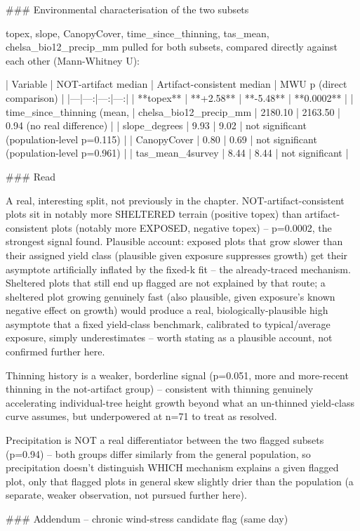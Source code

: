 ### Environmental characterisation of the two subsets

topex, slope, CanopyCover, time_since_thinning, tas_mean, chelsa_bio12_precip_mm pulled for both
subsets, compared directly against each other (Mann-Whitney U):

| Variable | NOT-artifact median | Artifact-consistent median | MWU p (direct comparison) |
|---|---:|---:|---:|
| **topex** | **+2.58** | **-5.48** | **0.0002** |
| time_since_thinning (mean, %
| chelsa_bio12_precip_mm | 2180.10 | 2163.50 | 0.94 (no real difference) |
| slope_degrees | 9.93 | 9.02 | not significant (population-level p=0.115) |
| CanopyCover | 0.80 | 0.69 | not significant (population-level p=0.961) |
| tas_mean_4survey | 8.44 | 8.44 | not significant |

### Read

A real, interesting split, not previously in the chapter. NOT-artifact-consistent plots sit in
notably more SHELTERED terrain (positive topex) than artifact-consistent plots (notably more
EXPOSED, negative topex) -- p=0.0002, the strongest signal found. Plausible account: exposed
plots that grow slower than their assigned yield class (plausible given exposure suppresses
growth) get their asymptote artificially inflated by the fixed-k fit -- the already-traced
mechanism. Sheltered plots that still end up flagged are not explained by that route; a sheltered
plot growing genuinely fast (also plausible, given exposure's known negative effect on growth)
would produce a real, biologically-plausible high asymptote that a fixed yield-class benchmark,
calibrated to typical/average exposure, simply underestimates -- worth stating as a plausible
account, not confirmed further here.

Thinning history is a weaker, borderline signal (p=0.051, more and more-recent thinning in the
not-artifact group) -- consistent with thinning genuinely accelerating individual-tree height
growth beyond what an un-thinned yield-class curve assumes, but underpowered at n=71 to treat as
resolved.

Precipitation is NOT a real differentiator between the two flagged subsets (p=0.94) -- both
groups differ similarly from the general population, so precipitation doesn't distinguish WHICH
mechanism explains a given flagged plot, only that flagged plots in general skew slightly drier
than the population (a separate, weaker observation, not pursued further here).

### Addendum -- chronic wind-stress candidate flag (same day)

